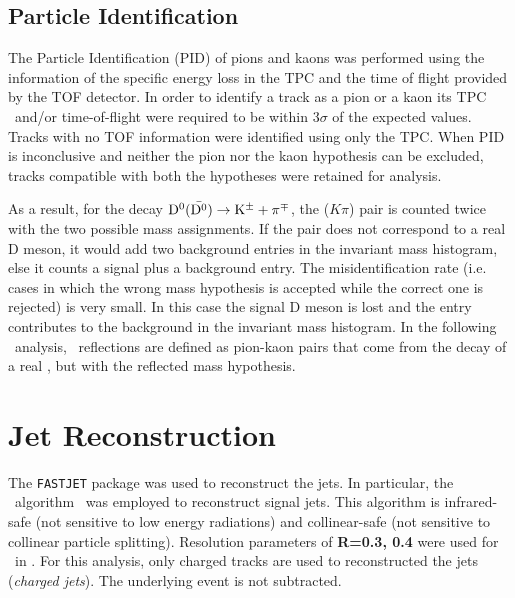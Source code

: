 \subsection{Particle Identification}

The Particle Identification (PID) of pions and kaons was performed using the information of the specific energy loss 
in the TPC and the time of flight provided by the TOF detector. 
In order to identify a track as a pion or a kaon its TPC \dedx\ and/or time-of-flight were required to be within 3$\sigma$ of the expected values. 
Tracks with no TOF information were identified using only the TPC.
When PID is inconclusive and neither the pion nor the kaon hypothesis can be excluded, tracks compatible with both the hypotheses 
were retained for analysis.

As a result, for the decay $\mathrm{D^{0}} (\bar{\mathrm{D^{0}}}) \to {\rm K}^{\pm} + \pi^{\mp}$, the ($K\pi$) pair is counted twice with the two possible mass assignments. If the pair does not correspond
to a real D meson, it would add two background entries in the invariant mass histogram, else it 
counts a signal plus a background entry. 
The misidentification rate (i.e. cases in which the wrong mass
hypothesis is accepted while the correct one is rejected) is very small. In this case the signal D meson
is lost and the entry contributes to the background in the invariant mass histogram. In the following \Dzero\ analysis, \Dzero\
reflections are defined as pion-kaon pairs that come from the decay of a real \Dzero, but with the reflected mass hypothesis.



\section{Jet Reconstruction}

The \texttt{FASTJET}\cite{Cacciari:2012} package was used to reconstruct the jets. 
In particular, the \antikt\ algorithm~\cite{Cacciari:2008c} was employed to reconstruct signal jets. 
This algorithm is infrared-safe (not sensitive to low energy radiations) and collinear-safe (not sensitive to collinear particle splitting).
Resolution parameters of {\textbf{R=0.3, 0.4}} were used for \Dzero\ in \pp.
For this analysis, only charged tracks are used to reconstructed the jets (\emph{charged jets}). The underlying event is not subtracted.

